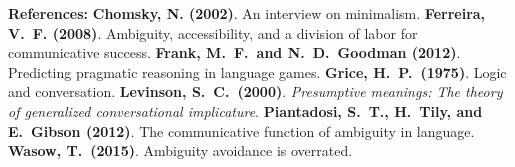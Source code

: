 \documentclass[12pt]{article}
\begin{document}
{\scriptsize
\noindent \textbf{References:} \textbf{Chomsky, N. (2002)}. An interview on minimalism. %
\textbf{Ferreira, V.~F. (2008)}. Ambiguity, accessibility, and a division of labor for communicative success. %
\textbf{Frank, M.~F.~and N.~D.~Goodman (2012)}. Predicting pragmatic reasoning in language games. %
\textbf{Grice, H.~P.~(1975)}. Logic and conversation. %
\textbf{Levinson, S.~C.~(2000)}. \emph{Presumptive meanings: The theory of generalized conversational implicature}. %
\textbf{Piantadosi, S.~T., H.~Tily, and E.~Gibson (2012)}. The communicative function of ambiguity in language. %
\textbf{Wasow, T.~(2015)}. Ambiguity avoidance is overrated. %
}

\newpage 

{\scriptsize
 
\renewcommand{\bibsection}{}
\setlength{\bibsep}{0pt}

}
\end{document}

